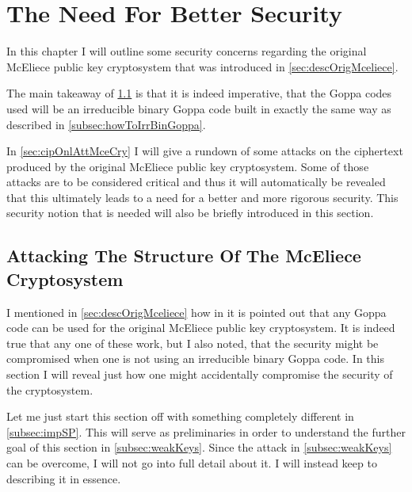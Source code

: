 
\chapter{The Need For Better Security}
\label{chap:needBetSec}

In this chapter I will outline some security concerns regarding the original McEliece public key cryptosystem that was introduced in \cref{sec:descOrigMceliece}.

The main takeaway of \cref{sec:attStrMceCry} is that it is indeed imperative, that the Goppa codes used will be an irreducible binary Goppa code built in exactly the same way as described in \cref{subsec:howToIrrBinGoppa}.

In \cref{sec:cipOnlAttMceCry} I will give a rundown of some attacks on the ciphertext produced by the original McEliece public key cryptosystem. Some of those attacks are to be considered critical and thus it will automatically be revealed that this ultimately leads to a need for a better and more rigorous security. This security notion that is needed will also be briefly introduced in this section.



\section{Attacking The Structure Of The McEliece Cryptosystem}
\label{sec:attStrMceCry}

I mentioned in \cref{sec:descOrigMceliece} how in \cite{EOS} it is pointed out that any Goppa code can be used for the original McEliece public key cryptosystem. It is indeed true that any one of these work, but I also noted, that the security might be compromised when one is not using an irreducible binary Goppa code. In this section I will reveal just how one might accidentally compromise the security of the cryptosystem.

Let me just start this section off with something completely different in \cref{subsec:impSP}. This will serve as preliminaries in order to understand the further goal of this section in \cref{subsec:weakKeys}. Since the attack in \cref{subsec:weakKeys} can be overcome, I will not go into full detail about it. I will instead keep to describing it in essence.



